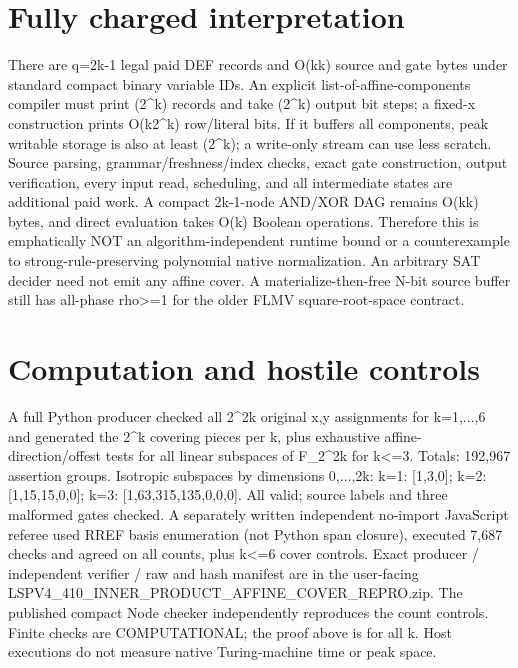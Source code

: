 \documentclass[11pt]{article}
\begin{document}
\section*{Fully charged interpretation}
There are q=2k-1 legal paid DEF records and O(k\log k) source and gate bytes under standard compact binary variable IDs. An explicit list-of-affine-components compiler must print \Omega(2^k) records and take \Omega(2^k) output bit steps; a fixed-x construction prints O(k2^k) row/literal bits. If it buffers all components, peak writable storage is also at least \Omega(2^k); a write-only stream can use less scratch. Source parsing, grammar/freshness/index checks, exact gate construction, output verification, every input read, scheduling, and all intermediate states are additional paid work. A compact 2k-1-node AND/XOR DAG remains O(k\log k) bytes, and direct evaluation takes O(k) Boolean operations. Therefore this is emphatically NOT an algorithm-independent runtime bound or a counterexample to strong-rule-preserving polynomial native normalization. An arbitrary SAT decider need not emit any affine cover. A materialize-then-free N-bit source buffer still has all-phase rho>=1 for the older FLMV square-root-space contract.

\section*{Computation and hostile controls}
A full Python producer checked all 2^{2k} original x,y assignments for k=1,...,6 and generated the 2^k covering pieces per k, plus exhaustive affine-direction/offest tests for all linear subspaces of F_2^{2k} for k<=3. Totals: 192,967 assertion groups. Isotropic subspaces by dimensions 0,...,2k: k=1: [1,3,0]; k=2: [1,15,15,0,0]; k=3: [1,63,315,135,0,0,0]. All valid; source labels and three malformed gates checked. A separately written independent no-import JavaScript referee used RREF basis enumeration (not Python span closure), executed 7,687 checks and agreed on all counts, plus k<=6 cover controls. Exact producer / independent verifier / raw and hash manifest are in the user-facing LSPV4_410_INNER_PRODUCT_AFFINE_COVER_REPRO.zip. The published compact Node checker independently reproduces the count controls. Finite checks are COMPUTATIONAL; the proof above is for all k. Host executions do not measure native Turing-machine time or peak space.
\end{document}
